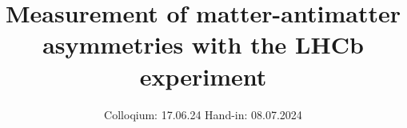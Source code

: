 

\subject{Advanced laboratory course}
\title{Measurement of matter-antimatter asymmetries with the LHCb experiment}
\date{%
  Colloqium: 17.06.24
  \hspace{3em}
  Hand-in: 08.07.2024
}



\maketitle
\thispagestyle{empty}
\tableofcontents
\newpage






\printbibliography{}



